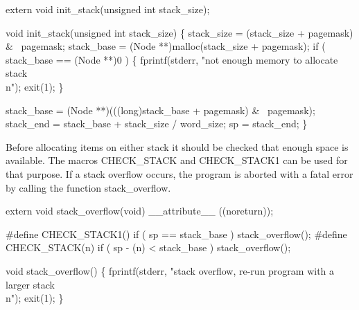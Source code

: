 \nwenddocs{}\plusendmoddef\nwstartdeflinemarkup{}\nwenddeflinemarkup
extern void init_stack(unsigned int stack_size);

\nwendcode{}\nwdocspar
\nwenddocs{}\plusendmoddef\nwstartdeflinemarkup{}\nwenddeflinemarkup
void
init_stack(unsigned int stack_size)
\{
    stack_size = (stack_size + pagemask) & ~pagemask;
    stack_base = (Node **)malloc(stack_size + pagemask);
    if ( stack_base == (Node **)0 )
    \{
        fprintf(stderr, "not enough memory to allocate stack\\n");
        exit(1);
    \}

    stack_base = (Node **)(((long)stack_base + pagemask) & ~pagemask); 
    stack_end  = stack_base + stack_size / word_size;
    sp         = stack_end;
\}

\nwendcode{}\nwdocspar
Before allocating items on either stack it should be checked that
enough space is available. The macros {\Tt{}CHECK{\_}STACK\nwendquote} and
{\Tt{}CHECK{\_}STACK1\nwendquote} can be used for that purpose. If a stack overflow
occurs, the program is aborted with a fatal error by calling the
function {\Tt{}stack{\_}overflow\nwendquote}.

\nwenddocs{}\plusendmoddef\nwstartdeflinemarkup{}\nwenddeflinemarkup
extern void stack_overflow(void) __attribute__ ((noreturn));

#define CHECK_STACK1()   if ( sp == stack_base ) stack_overflow();
#define CHECK_STACK(n)   if ( sp - (n) < stack_base ) stack_overflow();

\nwendcode{}\nwdocspar
\nwenddocs{}\plusendmoddef\nwstartdeflinemarkup{}\nwenddeflinemarkup
void
stack_overflow()
\{
    fprintf(stderr, "stack overflow, re-run program with a larger stack\\n");
    exit(1);
\}

